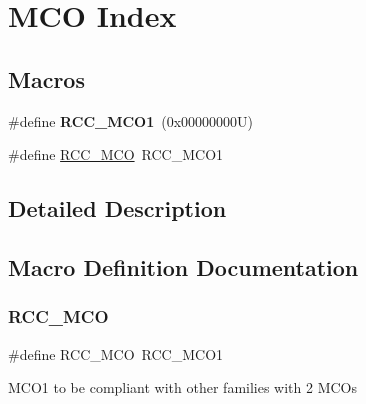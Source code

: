 \hypertarget{group___r_c_c___m_c_o___index}{}\section{M\+CO Index}
\label{group___r_c_c___m_c_o___index}
\subsection*{Macros}
\begin{DoxyCompactItemize}
\item 
\mbox{\label{group___r_c_c___m_c_o___index_ga152dd1ae9455e528526c4e23a817937b}} 
\#define {\bfseries R\+C\+C\+\_\+\+M\+C\+O1}~(0x00000000\+U)
\item 
\#define \hyperlink{group___r_c_c___m_c_o___index_gad9bc2abe13f0d3e62a5f9aa381927eb3}{R\+C\+C\+\_\+\+M\+CO}~R\+C\+C\+\_\+\+M\+C\+O1
\end{DoxyCompactItemize}


\subsection{Detailed Description}


\subsection{Macro Definition Documentation}
\mbox{\label{group___r_c_c___m_c_o___index_gad9bc2abe13f0d3e62a5f9aa381927eb3}} 
\subsubsection{\texorpdfstring{R\+C\+C\+\_\+\+M\+CO}{RCC\_MCO}}
{\footnotesize\ttfamily \#define R\+C\+C\+\_\+\+M\+CO~R\+C\+C\+\_\+\+M\+C\+O1}

M\+C\+O1 to be compliant with other families with 2 M\+C\+Os 